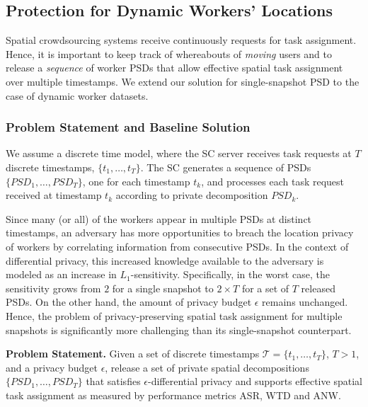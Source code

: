 \documentclass{USC-Thesis}
\renewcommand\bf\bfseries  %
\numberwithin{equation}{chapter}
\begin{document}
\subsection{Protection for Dynamic Workers' Locations}
\label{sec:psd_dynamic}

Spatial crowdsourcing systems receive continuously requests for task assignment. Hence, it is important to keep track of whereabouts of {\em moving} users and to release a {\em sequence} of worker PSDs that allow effective spatial task assignment over multiple timestamps. We extend our solution for single-snapshot PSD to the case of dynamic worker datasets.

\subsubsection{Problem Statement and Baseline Solution}
We assume a discrete time model, where the SC server receives task requests at $T$ discrete timestamps, $\{t_1, \ldots, t_T\}$. The SC generates a sequence of PSDs $\{PSD_1, \ldots, PSD_T\}$, one for each timestamp $t_k$, and processes each task request received at timestamp $t_k$ according to private decomposition $PSD_k$.

Since many (or all) of the workers appear in multiple PSDs at distinct timestamps, an adversary has more opportunities to breach the location privacy of workers by correlating information from consecutive PSDs. In the context of differential privacy, this increased knowledge available to the adversary is modeled as an increase in $L_1$-sensitivity. Specifically, in the worst case, the sensitivity grows from $2$ for a single snapshot to $2 \times T$ for a set of $T$ released PSDs. On the other hand, the amount of privacy budget $\epsilon$ remains unchanged. Hence, the problem of privacy-preserving spatial task assignment for multiple snapshots is significantly more challenging than its single-snapshot counterpart. 

\noindent
{\bf Problem Statement.} Given a set of discrete timestamps $\mathcal{T} = \{t_1, \ldots, t_T\}$, $T>1$, and a privacy budget $\epsilon$, release a set of private spatial decompositions $\{PSD_1, \ldots, PSD_T\}$ that satisfies $\epsilon$-differential privacy and supports effective spatial task assignment as measured by performance metrics ASR, WTD and ANW.
\end{document}

